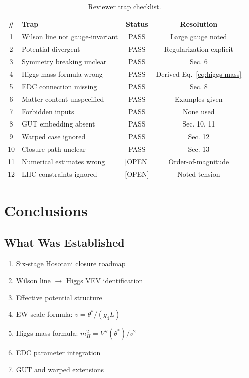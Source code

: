 \documentclass[11pt,a4paper]{article}
\newcommand{\tagOPEN}{\textcolor{red!70!black}{[OPEN]}}
\begin{document}
\begin{table}[h]
\centering
\begin{tabular}{clcc}
\toprule
\# & Trap & Status & Resolution \\
\midrule
1 & Wilson line not gauge-invariant & PASS & Large gauge noted \\
2 & Potential divergent & PASS & Regularization explicit \\
3 & Symmetry breaking unclear & PASS & Sec. 6 \\
4 & Higgs mass formula wrong & PASS & Derived Eq.~\eqref{eq:higgs-mass} \\
5 & EDC connection missing & PASS & Sec. 8 \\
6 & Matter content unspecified & PASS & Examples given \\
7 & Forbidden inputs & PASS & None used \\
8 & GUT embedding absent & PASS & Sec. 10, 11 \\
9 & Warped case ignored & PASS & Sec. 12 \\
10 & Closure path unclear & PASS & Sec. 13 \\
11 & Numerical estimates wrong & \tagOPEN & Order-of-magnitude \\
12 & LHC constraints ignored & \tagOPEN & Noted tension \\
\bottomrule
\end{tabular}
\caption{Reviewer trap checklist.}
\label{tab:traps}
\end{table}

\section{Conclusions}

\subsection{What Was Established}

\begin{enumerate}
    \item Six-stage Hosotani closure roadmap
    \item Wilson line $\to$ Higgs VEV identification
    \item Effective potential structure
    \item EW scale formula: $v = \theta^*/(g_4 L)$
    \item Higgs mass formula: $m_H^2 = V''(\theta^*)/v^2$
    \item EDC parameter integration
    \item GUT and warped extensions
\end{enumerate}
\end{document}
